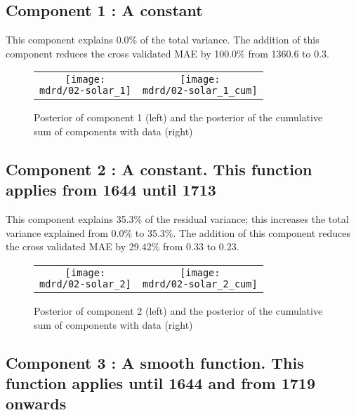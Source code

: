 \documentclass{article} %
\begin{document}
\subsection{Component 1 : A constant}



This component explains 0.0\% of the total variance.
The addition of this component reduces the cross validated MAE by 100.0\% from 1360.6 to 0.3.


\begin{figure}[H]
\newcommand{\wmgd}{0.5\columnwidth}
\newcommand{\hmgd}{3.0cm}
\newcommand{\mdrd}{figures/02-solar}
\newcommand{\mbm}{\hspace{-0.3cm}}
\begin{tabular}{cc}
\mbm \texttt{[image: \\mdrd/02-solar\_1]} & \texttt{[image: \\mdrd/02-solar\_1\_cum]}
\end{tabular}
\caption{Posterior of component 1 (left) and the posterior of the cumulative sum of components with data (right)}
\label{fig:comp1}
\end{figure}

\subsection{Component 2 : A constant. This function applies from 1644 until 1713}



This component explains 35.3\% of the residual variance; this increases the total variance explained from 0.0\% to 35.3\%.
The addition of this component reduces the cross validated MAE by 29.42\% from 0.33 to 0.23.


\begin{figure}[H]
\newcommand{\wmgd}{0.5\columnwidth}
\newcommand{\hmgd}{3.0cm}
\newcommand{\mdrd}{figures/02-solar}
\newcommand{\mbm}{\hspace{-0.3cm}}
\begin{tabular}{cc}
\mbm \texttt{[image: \\mdrd/02-solar\_2]} & \texttt{[image: \\mdrd/02-solar\_2\_cum]}
\end{tabular}
\caption{Posterior of component 2 (left) and the posterior of the cumulative sum of components with data (right)}
\label{fig:comp2}
\end{figure}

\subsection{Component 3 : A smooth function. This function applies until 1644 and from 1719 onwards}
\end{document}
